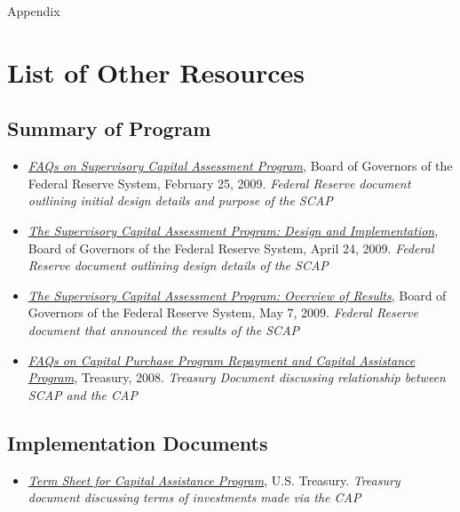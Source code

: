 \documentclass[justified, nobib]{tufte-handout2}
\begin{document}


\newpage
\appendix

\LARGE Appendix \normalsize
\section{List of Other Resources}

\subsection{Summary of Program}

\begin{itemize}
\item
  \href{http://www.federalreserve.gov/newsevents/press/bcreg/bcreg20090225a1.pdf}{\emph{FAQs
  on Supervisory Capital Assessment Program}}, Board of Governors of the
  Federal Reserve System, February 25, 2009. \emph{Federal Reserve
  document outlining initial design details and purpose of the SCAP}
\item
  \href{http://www.federalreserve.gov/bankinforeg/bcreg20090424a1.pdf}{\emph{The
  Supervisory Capital Assessment Program: Design and Implementation}},
  Board of Governors of the Federal Reserve System, April 24, 2009.
  \emph{Federal Reserve document outlining design details of the SCAP}
\item
  \href{http://www.federalreserve.gov/newsevents/press/bcreg/bcreg20090507a1.pdfhttp:/www.federalreserve.gov/newsevents/press/bcreg/bcreg20090507a1.pdf?bcsi_scan_D92198957E035F0B=0\&bcsi_scan_filename=bcreg20090507a1.pdf}{\emph{The
  Supervisory Capital Assessment Program: Overview of Results}}, Board
  of Governors of the Federal Reserve System, May 7, 2009. \emph{Federal
  Reserve document that announced the results of the SCAP}
\item
  \href{http://www.treasury.gov/initiatives/financial-stability/TARP-Programs/bank-investment-programs/scap-and-cap/Documents/FAQ_CPP-CAP.pdf}{\emph{FAQs
  on Capital Purchase Program Repayment and Capital Assistance
  Program}}, Treasury, 2008. \emph{Treasury Document discussing
  relationship between SCAP and the CAP}
\end{itemize}

\subsection{Implementation Documents}
\begin{itemize}
\item
  \href{http://www.treasury.gov/press-center/press-releases/Documents/tg40_captermsheet.pdf}{\emph{Term
  Sheet for Capital Assistance Program}}, U.S. Treasury. \emph{Treasury
  document discussing terms of investments made via the CAP}
\end{itemize}
\end{document}
